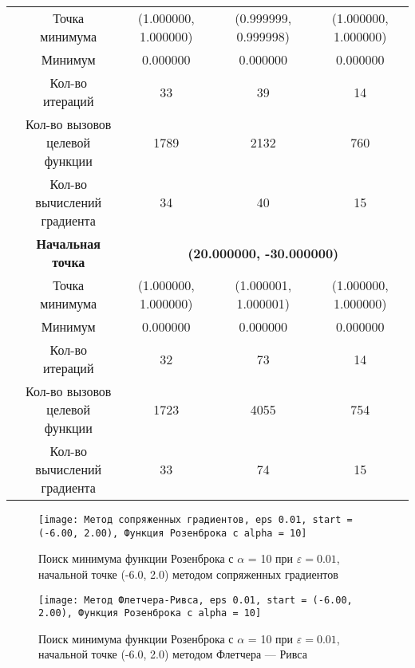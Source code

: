 \begin{table}[H]
\begin{tabular}{|c|c|c|c|c|}
	\cline{2-5}
	&Точка минимума &(1.000000, 1.000000) &(0.999999, 0.999998) &(1.000000, 1.000000) \\ 
	\cline{2-5}
	&Минимум &0.000000 &0.000000 &0.000000 \\ 
	\cline{2-5}
	&Кол-во итераций &33 &39 &14 \\ 
	\cline{2-5}
	&\makecell{Кол-во вызовов\\целевой функции} &1789 &2132 &760 \\ 
	\cline{2-5}
	&\makecell{Кол-во вычислений\\градиента} &34 &40 &15 \\ 
	\cline{2-5}
\cline{2-5}&\textbf{Начальная точка} &\multicolumn{3}{c|}{\textbf{(20.000000, -30.000000)}}\\
	\cline{2-5}
	&Точка минимума &(1.000000, 1.000000) &(1.000001, 1.000001) &(1.000000, 1.000000) \\ 
	\cline{2-5}
	&Минимум &0.000000 &0.000000 &0.000000 \\ 
	\cline{2-5}
	&Кол-во итераций &32 &73 &14 \\ 
	\cline{2-5}
	&\makecell{Кол-во вызовов\\целевой функции} &1723 &4055 &754 \\ 
	\cline{2-5}
	&\makecell{Кол-во вычислений\\градиента} &33 &74 &15 \\ 
	\cline{2-5}
	\hline

\end{tabular}
\end{table}


            \begin{figure}[H]
	        \centering
	        \texttt{[image: Метод сопряженных градиентов, eps 0.01, start = (-6.00, 2.00), Функция Розенброка с alpha = 10]}%
	        \caption{Поиск минимума функции Розенброка с $\alpha$ = 10 при $\varepsilon = 0.01$, начальной точке (-6.0, 2.0) методом сопряженных градиентов}
	        \vspace*{-1.2cm}
            \end{figure}
            
            \begin{figure}[H]
	        \centering
	        \texttt{[image: Метод Флетчера-Ривса, eps 0.01, start = (-6.00, 2.00), Функция Розенброка с alpha = 10]}%
	        \caption{Поиск минимума функции Розенброка с $\alpha$ = 10 при $\varepsilon = 0.01$, начальной точке (-6.0, 2.0) методом Флетчера --- Ривса}
	        \vspace*{-1.2cm}
            \end{figure}
            
